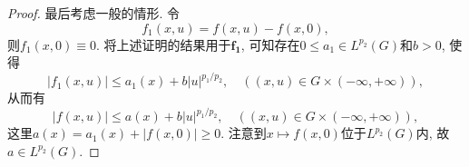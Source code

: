 \begin{proposition}
\begin{proof}
        最后考虑一般的情形. 令 
        \begin{equation*}
            f_1(x, u) = f(x, u) - f(x, 0),
        \end{equation*}
        则$f_1(x, 0) \equiv 0$. 将上述证明的结果用于$\bm{f_1}$, 可知存在$0 \leq a_1 \in L^{p_2}(G)$和$b > 0$, 使得 
        \begin{equation*}
            |f_1(x, u)| \leq a_1(x) + b|u|^{p_1/p_2}, \quad ((x, u) \in G \times (-\infty, +\infty)),
        \end{equation*}
        从而有 
        \begin{equation*}
            |f(x, u)| \leq a(x) + b|u|^{p_1/p_2}, \quad ((x, u) \in G \times (-\infty, +\infty)),
        \end{equation*}
        这里$a(x) = a_1(x) + |f(x, 0)| \geq 0$. 注意到$x \mapsto f(x, 0)$位于$L^{p_2}(G)$内, 故$a \in L^{p_2}(G)$.
    \end{proof}
\end{proposition}
